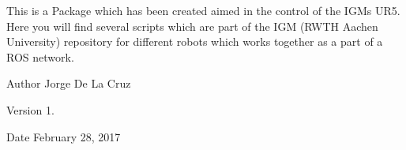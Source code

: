 This is a Package which has been created aimed in the control of the I\+GM\textquotesingle{}s U\+R5. Here you will find several scripts which are part of the I\+GM (R\+W\+TH Aachen University) repository for different robots which works together as a part of a R\+OS network.

\begin{DoxyAuthor}{Author}
Jorge De La Cruz 
\end{DoxyAuthor}
\begin{DoxyVersion}{Version}
1. 
\end{DoxyVersion}
\begin{DoxyDate}{Date}
February 28, 2017 
\end{DoxyDate}
